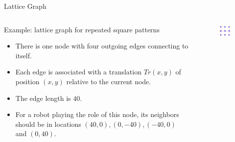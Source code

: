 \documentclass[10pt]{beamer}
\begin{document}
\begin{frame}{Lattice Graph}
    \begin{columns}[T] %
      \begin{column}{.6\textwidth}
        \begin{block}{Example: lattice graph for repeated square patterns}
        \begin{itemize}
          \item  There is one node with four outgoing edges connecting to itself. 
          \item Each edge is associated with a translation $Tr(x, y)$
            of position $(x, y)$ relative to the current node.
          \item The edge length is $40$. 
          \item For a robot playing the role of this node, its
            neighbors should be in locations $(40, 0), (0, -40), (-40,
            0)$ and $(0, 40)$.
          \end{itemize}
        \end{block}
      \end{column}%
      \begin{column}{.4\textwidth}
        \begin{figure}
          \centering
        \end{figure}
        \begin{figure}
          \centering
          \includegraphics[scale=1]{figs/squarelattice}
        \end{figure}
      \end{column}%
    \end{columns}
\end{frame}
\end{document}
